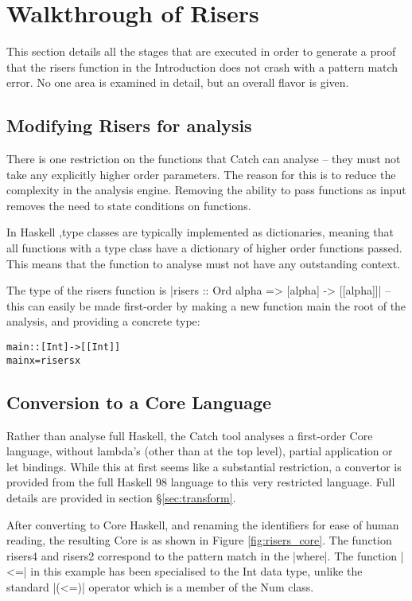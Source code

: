 \documentclass[preprint]{sigplanconf}
\newcommand{\C}[1]{\textsf{#1}}
\newenvironment{code}{\begin{alltt}\small}{\end{alltt}}
\begin{document}
\section{Walkthrough of Risers}
\label{sec:walkthrough}

This section details all the stages that are executed in order to generate a proof that the \C{risers} function in the Introduction does not crash with a pattern match error. No one area is examined in detail, but an overall flavor is given.

\subsection{Modifying Risers for analysis}

There is one restriction on the functions that Catch can analyse -- they must not take any explicitly higher order parameters. The reason for this is to reduce the complexity in the analysis engine. Removing the ability to pass functions as input removes the need to state conditions on functions.

In Haskell \citep{haskell},type classes are typically implemented \citep{type_classes} as dictionaries, meaning that all functions with a type class have a dictionary of higher order functions passed. This means that the function to analyse must not have any outstanding context.

The type of the \C{risers} function is |risers :: Ord alpha => [alpha] -> [[alpha]]| -- this can easily be made first-order by making a new function \C{main} the root of the analysis, and providing a concrete type:

\begin{code}
main :: [Int] -> [[Int]]
main x = risers x
\end{code}

\subsection{Conversion to a Core Language}

Rather than analyse full Haskell, the Catch tool analyses a first-order Core language, without lambda's (other than at the top level), partial application or let bindings. While this at first seems like a substantial restriction, a convertor is provided from the full Haskell 98 language to this very restricted language. Full details are provided in section \S\ref{sec:transform}.

After converting to Core Haskell, and renaming the identifiers for ease of human reading, the resulting Core is as shown in Figure \ref{fig:risers_core}. The function \C{risers4} and \C{risers2} correspond to the pattern match in the |where|. The function |<=| in this example has been specialised to the Int data type, unlike the standard |(<=)| operator which is a member of the \C{Num} class.
\end{document}
